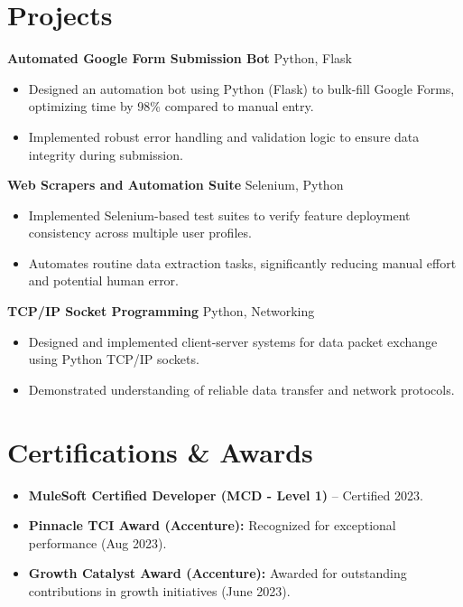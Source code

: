 \documentclass[letterpaper,10pt]{article}
\begin{document}
\section*{Projects}
\textbf{Automated Google Form Submission Bot} \hfill Python, Flask \\
\begin{itemize}
    \item Designed an automation bot using Python (Flask) to bulk-fill Google Forms, optimizing time by 98\% compared to manual entry.
    \item Implemented robust error handling and validation logic to ensure data integrity during submission.
\end{itemize}

\textbf{Web Scrapers and Automation Suite} \hfill Selenium, Python \\
\begin{itemize}
    \item Implemented Selenium-based test suites to verify feature deployment consistency across multiple user profiles.
    \item Automates routine data extraction tasks, significantly reducing manual effort and potential human error.
\end{itemize}

\textbf{TCP/IP Socket Programming} \hfill Python, Networking \\
\begin{itemize}
    \item Designed and implemented client-server systems for data packet exchange using Python TCP/IP sockets.
    \item Demonstrated understanding of reliable data transfer and network protocols.
\end{itemize}



\section*{Certifications \& Awards}
\begin{itemize} \itemsep -2pt
    \item \textbf{MuleSoft Certified Developer (MCD - Level 1)} -- Certified 2023.
    \item \textbf{Pinnacle TCI Award (Accenture):} Recognized for exceptional performance (Aug 2023).
    \item \textbf{Growth Catalyst Award (Accenture):} Awarded for outstanding contributions in growth initiatives (June 2023).
\end{itemize}
\end{document}
